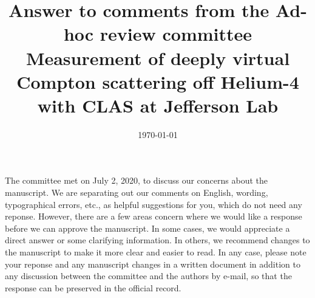 \documentclass[a4paper,11pt,twoside]{article}
\title{Answer to comments from the Ad-hoc review committee \\
 Measurement of deeply virtual Compton
scattering off Helium-4 with CLAS at Jefferson Lab}
\date{\today}
\begin{document}
\maketitle

\section*{}

The committee met on July 2, 2020, to discuss our concerns about the manuscript. We are separating out
our comments on English, wording, typographical errors, etc., as helpful suggestions for you, which do not need
any reponse. However, there are a few areas concern where we would like a response before we can approve the
manuscript. In some cases, we would appreciate a direct answer or some clarifying information. In others, we
recommend changes to the manuscript to make it more clear and easier to read. In any case, please note your
reponse and any manuscript changes in a written document in addition to any discussion between the committee
and the authors by e-mail, so that the response can be preserved in the official record.
\end{document}
